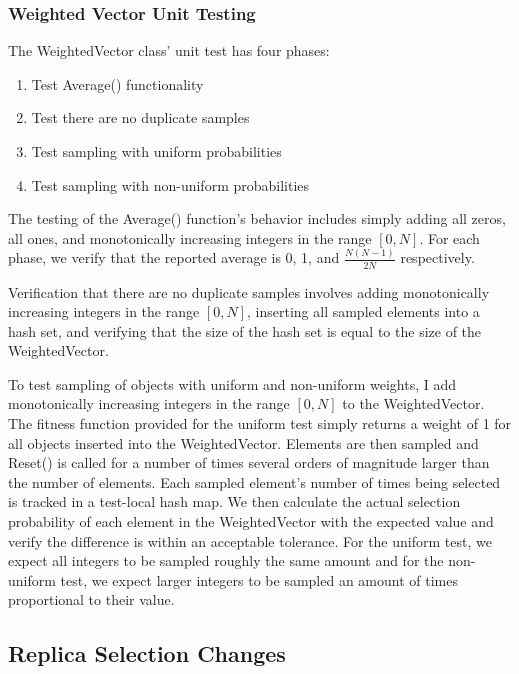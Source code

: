 \documentclass[12pt]{article}
\begin{document}
    \subsubsection{Weighted Vector Unit Testing}

    The WeightedVector class' unit test has four phases:

    \begin{tcolorbox}
    \begin{enumerate}
      \item Test Average() functionality
      \item Test there are no duplicate samples
      \item Test sampling with uniform probabilities
      \item Test sampling with non-uniform probabilities
    \end{enumerate}
    \end{tcolorbox}

    The testing of the Average() function's behavior includes simply adding all
    zeros, all ones, and monotonically increasing integers in the range
    $[0,N]$. For each phase, we verify that the reported average is 0, 1, and
    $\frac{N(N-1)}{2N}$ respectively.  

    Verification that there are no duplicate samples involves adding
    monotonically increasing integers in the range $[0,N]$, inserting all
    sampled elements into a hash set, and verifying that the size of the hash
    set is equal to the size of the WeightedVector.

    To test sampling of objects with uniform and non-uniform weights, I add
    monotonically increasing integers in the range $[0,N]$ to the
    WeightedVector. The fitness function provided for the uniform test simply
    returns a weight of 1 for all objects inserted into the WeightedVector.
    Elements are then sampled and Reset() is called for a number of times
    several orders of magnitude larger than the number of elements. Each
    sampled element's number of times being selected is tracked in a test-local
    hash map. We then calculate the actual selection probability of each
    element in the WeightedVector with the expected value and verify the
    difference is within an acceptable tolerance. For the uniform test, we
    expect all integers to be sampled roughly the same amount and for the
    non-uniform test, we expect larger integers to be sampled an amount of
    times proportional to their value.

  \subsection{Replica Selection Changes}
    
\end{document}
